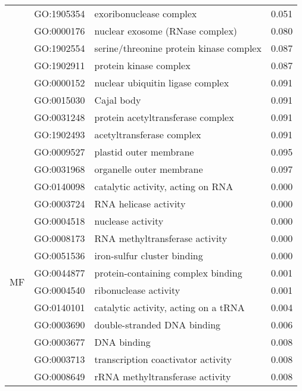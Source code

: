 \begin{longtable}{lllr}
   & GO:1905354 &                      exoribonuclease complex &         0.051 \\
   & GO:0000176 &              nuclear exosome (RNase complex) &         0.080 \\
   & GO:1902554 &      serine/threonine protein kinase complex &         0.087 \\
   & GO:1902911 &                       protein kinase complex &         0.087 \\
   & GO:0000152 &             nuclear ubiquitin ligase complex &         0.091 \\
   & GO:0015030 &                                   Cajal body &         0.091 \\
   & GO:0031248 &            protein acetyltransferase complex &         0.091 \\
   & GO:1902493 &                    acetyltransferase complex &         0.091 \\
   & GO:0009527 &                       plastid outer membrane &         0.095 \\
   & GO:0031968 &                     organelle outer membrane &         0.097 \\
\cline{1-4}
\multirow{56}{*}{MF} & GO:0140098 &            catalytic activity, acting on RNA &         0.000 \\
   & GO:0003724 &                        RNA helicase activity &         0.000 \\
   & GO:0004518 &                            nuclease activity &         0.000 \\
   & GO:0008173 &               RNA methyltransferase activity &         0.000 \\
   & GO:0051536 &                  iron-sulfur cluster binding &         0.000 \\
   & GO:0044877 &           protein-containing complex binding &         0.001 \\
   & GO:0004540 &                        ribonuclease activity &         0.001 \\
   & GO:0140101 &         catalytic activity, acting on a tRNA &         0.004 \\
   & GO:0003690 &                  double-stranded DNA binding &         0.006 \\
   & GO:0003677 &                                  DNA binding &         0.008 \\
   & GO:0003713 &           transcription coactivator activity &         0.008 \\
   & GO:0008649 &              rRNA methyltransferase activity &         0.008 \\

\end{longtable}
